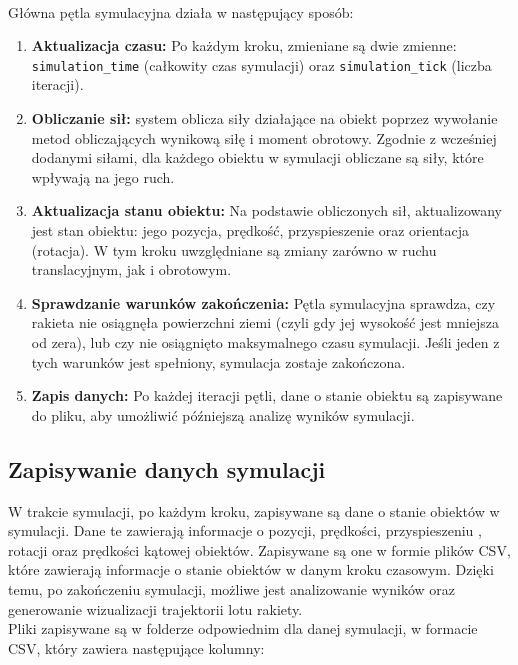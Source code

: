 \\ Główna pętla symulacyjna działa w następujący sposób:

\begin{enumerate}
    \item \textbf{Aktualizacja czasu:} Po każdym kroku, zmieniane są dwie zmienne: \texttt{simulation\_time} (całkowity czas symulacji) oraz \texttt{simulation\_tick} (liczba iteracji).
    \item \textbf{Obliczanie sił:} system oblicza siły działające na obiekt poprzez wywołanie metod obliczających wynikową siłę i moment obrotowy. Zgodnie z wcześniej dodanymi siłami, dla każdego obiektu w symulacji obliczane są siły, które wpływają na jego ruch.
    \item \textbf{Aktualizacja stanu obiektu:} Na podstawie obliczonych sił, aktualizowany jest stan obiektu: jego pozycja, prędkość, przyspieszenie oraz orientacja (rotacja). W tym kroku uwzględniane są zmiany zarówno w ruchu translacyjnym, jak i obrotowym.
    \item \textbf{Sprawdzanie warunków zakończenia:} Pętla symulacyjna sprawdza, czy rakieta nie osiągnęła powierzchni ziemi (czyli gdy jej wysokość jest mniejsza od zera), lub czy nie osiągnięto maksymalnego czasu symulacji. Jeśli jeden z tych warunków jest spełniony, symulacja zostaje zakończona.
    \item \textbf{Zapis danych:} Po każdej iteracji pętli, dane o stanie obiektu są zapisywane do pliku, aby umożliwić późniejszą analizę wyników symulacji.
\end{enumerate}

\subsection{Zapisywanie danych symulacji}\label{sec:zapisywanie-danych-symulacji.}

W trakcie symulacji, po każdym kroku, zapisywane są dane o stanie obiektów w
symulacji. Dane te zawierają informacje o pozycji, prędkości, przyspieszeniu
, rotacji oraz prędkości kątowej obiektów. Zapisywane są one w formie plików CSV, które zawierają informacje o stanie obiektów w danym kroku czasowym. Dzięki temu, po zakończeniu symulacji, możliwe jest analizowanie wyników oraz generowanie wizualizacji trajektorii lotu rakiety.\\
Pliki zapisywane są w folderze odpowiednim dla danej symulacji, w formacie CSV, który zawiera następujące kolumny:

